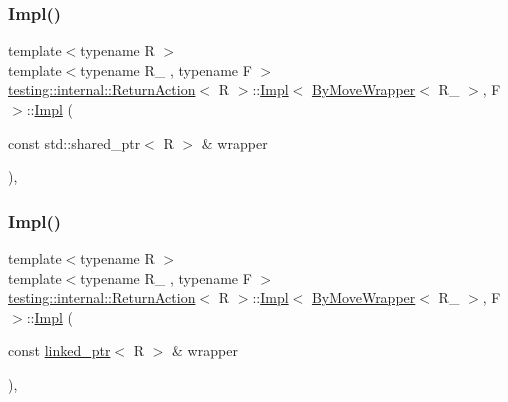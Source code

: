 \subsubsection{\texorpdfstring{Impl()}{Impl()}\hspace{0.1cm}{\footnotesize\ttfamily [2/3]}}
{\footnotesize\ttfamily template$<$typename R $>$ \\
template$<$typename R\+\_\+ , typename F $>$ \\
\mbox{\hyperlink{classtesting_1_1internal_1_1_return_action}{testing\+::internal\+::\+Return\+Action}}$<$ R $>$\+::\mbox{\hyperlink{classtesting_1_1internal_1_1_return_action_1_1_impl}{Impl}}$<$ \mbox{\hyperlink{structtesting_1_1internal_1_1_by_move_wrapper}{By\+Move\+Wrapper}}$<$ R\+\_\+ $>$, F $>$\+::\mbox{\hyperlink{classtesting_1_1internal_1_1_return_action_1_1_impl}{Impl}} (\begin{DoxyParamCaption}\item[{const std\+::shared\+\_\+ptr$<$ R $>$ \&}]{wrapper }\end{DoxyParamCaption})\hspace{0.3cm}{\ttfamily [inline]}, {\ttfamily [explicit]}}

\mbox{\label{classtesting_1_1internal_1_1_return_action_1_1_impl_3_01_by_move_wrapper_3_01_r___01_4_00_01_f_01_4_a4f6ed0465b3f7b116142025c7f7ec3d2}} 
\subsubsection{\texorpdfstring{Impl()}{Impl()}\hspace{0.1cm}{\footnotesize\ttfamily [3/3]}}
{\footnotesize\ttfamily template$<$typename R $>$ \\
template$<$typename R\+\_\+ , typename F $>$ \\
\mbox{\hyperlink{classtesting_1_1internal_1_1_return_action}{testing\+::internal\+::\+Return\+Action}}$<$ R $>$\+::\mbox{\hyperlink{classtesting_1_1internal_1_1_return_action_1_1_impl}{Impl}}$<$ \mbox{\hyperlink{structtesting_1_1internal_1_1_by_move_wrapper}{By\+Move\+Wrapper}}$<$ R\+\_\+ $>$, F $>$\+::\mbox{\hyperlink{classtesting_1_1internal_1_1_return_action_1_1_impl}{Impl}} (\begin{DoxyParamCaption}\item[{const \mbox{\hyperlink{classtesting_1_1internal_1_1linked__ptr}{linked\+\_\+ptr}}$<$ R $>$ \&}]{wrapper }\end{DoxyParamCaption})\hspace{0.3cm}{\ttfamily [inline]}, {\ttfamily [explicit]}}



